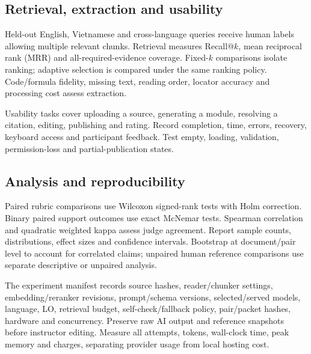 \subsection{Retrieval, extraction and usability}
Held-out English, Vietnamese and cross-language queries receive human labels allowing multiple relevant chunks. Retrieval measures Recall@$k$, mean reciprocal rank (MRR) and all-required-evidence coverage. Fixed-$k$ comparisons isolate ranking; adaptive selection is compared under the same ranking policy. Code/formula fidelity, missing text, reading order, locator accuracy and processing cost assess extraction.

Usability tasks cover uploading a source, generating a module, resolving a citation, editing, publishing and rating. Record completion, time, errors, recovery, keyboard access and participant feedback. Test empty, loading, validation, permission-loss and partial-publication states.
\subsection{Analysis and reproducibility}
Paired rubric comparisons use Wilcoxon signed-rank tests\citep{wilcoxon} with Holm correction\citep{holm}. Binary paired support outcomes use exact McNemar tests\citep{mcnemar}. Spearman correlation\citep{spearman} and quadratic weighted kappa\citep{weightedkappa} assess judge agreement. Report sample counts, distributions, effect sizes and confidence intervals. Bootstrap\citep{bootstrap} at document/pair level to account for correlated claims; unpaired human reference comparisons use separate descriptive or unpaired analysis.

The experiment manifest records source hashes, reader/chunker settings, embedding/reranker revisions, prompt/schema versions, selected/served models, language, LO, retrieval budget, self-check/fallback policy, pair/packet hashes, hardware and concurrency. Preserve raw AI output and reference snapshots before instructor editing. Measure all attempts, tokens, wall-clock time, peak memory and charges, separating provider usage from local hosting cost.
